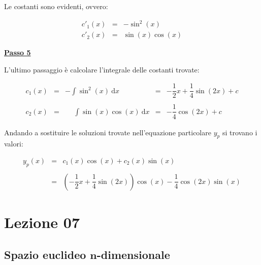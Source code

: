 \documentclass[a4paper]{article}
\begin{document}
	\noindent
	Le costanti sono evidenti, ovvero:
	
	\begin{equation*}
		\begin{array}{lll}
			c'_{1}\left(x\right)	& = & -\sin^{2}\left(x\right) \\
			c'_{2}\left(x\right)	& = & \sin\left(x\right)\cos\left(x\right)
		\end{array}
	\end{equation*}

	\noindent
	\textcolor{Red3}{\textbf{\underline{Passo 5}}}\newline
	
	\noindent
	L'ultimo passaggio è calcolare l'integrale delle costanti trovate:
	
	\begin{equation*}
		\begin{array}{lllll}
			c_{1}\left(x\right) & = & \displaystyle-\int\sin^{2}\left(x\right)\:\mathrm{d}x & = & -\dfrac{1}{2}x + \dfrac{1}{4}\sin\left(2x\right) + c \\
			&&&& \\
			c_{2}\left(x\right) & = & \displaystyle\phantom{-}\int\sin\left(x\right)\cos\left(x\right)\:\mathrm{d}x & = & -\dfrac{1}{4}\cos\left(2x\right) + c
		\end{array}
	\end{equation*}

	\noindent
	Andando a sostituire le soluzioni trovate nell'equazione particolare $y_{p}$ si trovano i valori:
	
	\begin{equation*}
		\begin{array}{lll}
			y_{p}\left(x\right) & = & c_{1}\left(x\right)\cos\left(x\right) + c_{2}\left(x\right)\sin\left(x\right) \\
			&& \\
								& = & \left(- \dfrac{1}{2}x + \dfrac{1}{4} \sin\left(2x\right)\right)\cos\left(x\right) - \dfrac{1}{4} \cos\left(2x\right)\sin\left(x\right)
		\end{array}
	\end{equation*}
	
	\newpage
	
	\section{Lezione 07}
	
	\subsection[Spazio euclideo ${n}$-dimensionale]{Spazio euclideo $\boldsymbol{n}$-dimensionale}
	
\end{document}
